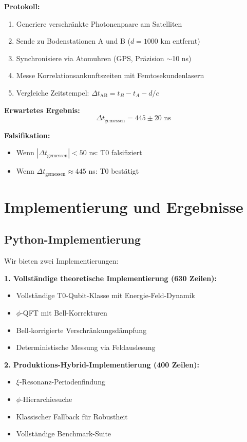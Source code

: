 \textbf{Protokoll:}
\begin{enumerate}
	\item Generiere verschränkte Photonenpaare am Satelliten
	\item Sende zu Bodenstationen A und B ($d = 1000$ km entfernt)
	\item Synchronisiere via Atomuhren (GPS, Präzision $\sim$10 ns)
	\item Messe Korrelationsankunftszeiten mit Femtosekundenlasern
	\item Vergleiche Zeitstempel: $\Delta t_{\text{AB}} = t_B - t_A - d/c$
\end{enumerate}

\textbf{Erwartetes Ergebnis:}
\begin{equation}
	\Delta t_{\text{gemessen}} = 445 \pm 20 \text{ ns}
\end{equation}

\textbf{Falsifikation:}
\begin{itemize}
	\item Wenn $|\Delta t_{\text{gemessen}}| < 50$ ns: T0 falsifiziert
	\item Wenn $\Delta t_{\text{gemessen}} \approx 445$ ns: T0 bestätigt
\end{itemize}

\section{Implementierung und Ergebnisse}
\label{sec:implementation}

\subsection{Python-Implementierung}

Wir bieten zwei Implementierungen:

\textbf{1. Vollständige theoretische Implementierung (630 Zeilen):}
\begin{itemize}
	\item Vollständige T0-Qubit-Klasse mit Energie-Feld-Dynamik
	\item $\phi$-QFT mit Bell-Korrekturen
	\item Bell-korrigierte Verschränkungsdämpfung
	\item Deterministische Messung via Feldauslesung
\end{itemize}

\textbf{2. Produktions-Hybrid-Implementierung (400 Zeilen):}
\begin{itemize}
	\item $\xi$-Resonanz-Periodenfindung
	\item $\phi$-Hierarchiesuche
	\item Klassischer Fallback für Robustheit
	\item Vollständige Benchmark-Suite
\end{itemize}

